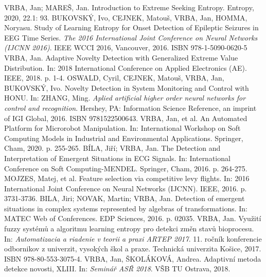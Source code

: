 \documentclass[11pt,twoside,openright]{report}
\begin{document}








%





\renewcommand{\bibname}{Publikace autora}
\begin{thebibliography}{A}
VRBA, Jan; MAREŠ, Jan. Introduction to Extreme Seeking Entropy. Entropy, 2020, 22.1: 93.
BUKOVSKÝ, Ivo, CEJNEK, Matouš, VRBA, Jan, HOMMA, Noryasu. Study of Learning Entropy for Onset Detection of Epileptic Seizures in EEG Time Series. \textit{The 2016 International Joint Conference on Neural Networks (IJCNN 2016)}. IEEE WCCI 2016, Vancouver, 2016. ISBN 978-1-5090-0620-5
VRBA, Jan. Adaptive Novelty Detection with Generalized Extreme Value Distribution. In: 2018 International Conference on Applied Electronics (AE). IEEE, 2018. p. 1-4.
OSWALD, Cyril, CEJNEK, Matouš, VRBA, Jan, BUKOVSKÝ, Ivo. Novelty Detection in System Monitoring and Control with HONU. In: ZHANG, Ming. \textit{ Aplied artificial higher order neural networks for control and recognition}. Hershey, PA: Information Science Reference, an imprint of IGI Global, 2016. ISBN 9781522500643.
VRBA, Jan, et al. An Automated Platform for Microrobot Manipulation. In: International Workshop on Soft Computing Models in Industrial and Environmental Applications. Springer, Cham, 2020. p. 255-265.
BÍLA, Jiří; VRBA, Jan. The Detection and Interpretation of Emergent Situations in ECG Signals. In: International Conference on Soft Computing-MENDEL. Springer, Cham, 2016. p. 264-275.
MOJZES, Matej, et al. Feature selection via competitive levy flights. In: 2016 International Joint Conference on Neural Networks (IJCNN). IEEE, 2016. p. 3731-3736.
BILA, Jiri; NOVAK, Martin; VRBA, Jan. Detection of emergent situations in complex systems represented by algebras of transformations. In: MATEC Web of Conferences. EDP Sciences, 2016. p. 02035.
VRBA, Jan. Využití fuzzy systémů a algoritmu learning entropy pro detekci změn stavů bioprocesu. In: \textit{Automatizacia a riadenie v teorii a praxi ARTEP 2017}. 11. ročník konferencie odbornikov z univerzit, vysokých škol a praxe. Technická univerzita Košice, 2017. ISBN 978-80-553-3075-4.
VRBA, Jan, ŠKOLÁKOVÁ, Andrea. Adaptivní metoda detekce novosti, XLIII. In: \textit{ Seminář ASŘ 2018}. VŠB TU Ostrava, 2018.

\end{thebibliography}
\end{document}
